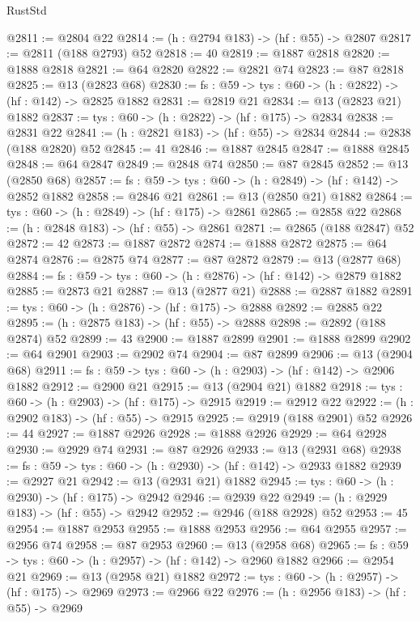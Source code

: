 \begin{lexlean}{RustStd}
\begin{coremodule}
@2811 := @2804 @22
@2814 := (h : @2794 @183) -> (hf : @55) -> @2807
@2817 := @2811 (@188 @2793) @52
@2818 := 40
@2819 := @1887 @2818
@2820 := @1888 @2818
@2821 := @64 @2820
@2822 := @2821 @74
@2823 := @87 @2818
@2825 := @13 (@2823 @68)
@2830 := {fs : @59} -> {tys : @60} -> (h : @2822) -> (hf : @142) -> @2825 @1882
@2831 := @2819 @21
@2834 := @13 (@2823 @21) @1882
@2837 := {tys : @60} -> (h : @2822) -> (hf : @175) -> @2834
@2838 := @2831 @22
@2841 := (h : @2821 @183) -> (hf : @55) -> @2834
@2844 := @2838 (@188 @2820) @52
@2845 := 41
@2846 := @1887 @2845
@2847 := @1888 @2845
@2848 := @64 @2847
@2849 := @2848 @74
@2850 := @87 @2845
@2852 := @13 (@2850 @68)
@2857 := {fs : @59} -> {tys : @60} -> (h : @2849) -> (hf : @142) -> @2852 @1882
@2858 := @2846 @21
@2861 := @13 (@2850 @21) @1882
@2864 := {tys : @60} -> (h : @2849) -> (hf : @175) -> @2861
@2865 := @2858 @22
@2868 := (h : @2848 @183) -> (hf : @55) -> @2861
@2871 := @2865 (@188 @2847) @52
@2872 := 42
@2873 := @1887 @2872
@2874 := @1888 @2872
@2875 := @64 @2874
@2876 := @2875 @74
@2877 := @87 @2872
@2879 := @13 (@2877 @68)
@2884 := {fs : @59} -> {tys : @60} -> (h : @2876) -> (hf : @142) -> @2879 @1882
@2885 := @2873 @21
@2887 := @13 (@2877 @21)
@2888 := @2887 @1882
@2891 := {tys : @60} -> (h : @2876) -> (hf : @175) -> @2888
@2892 := @2885 @22
@2895 := (h : @2875 @183) -> (hf : @55) -> @2888
@2898 := @2892 (@188 @2874) @52
@2899 := 43
@2900 := @1887 @2899
@2901 := @1888 @2899
@2902 := @64 @2901
@2903 := @2902 @74
@2904 := @87 @2899
@2906 := @13 (@2904 @68)
@2911 := {fs : @59} -> {tys : @60} -> (h : @2903) -> (hf : @142) -> @2906 @1882
@2912 := @2900 @21
@2915 := @13 (@2904 @21) @1882
@2918 := {tys : @60} -> (h : @2903) -> (hf : @175) -> @2915
@2919 := @2912 @22
@2922 := (h : @2902 @183) -> (hf : @55) -> @2915
@2925 := @2919 (@188 @2901) @52
@2926 := 44
@2927 := @1887 @2926
@2928 := @1888 @2926
@2929 := @64 @2928
@2930 := @2929 @74
@2931 := @87 @2926
@2933 := @13 (@2931 @68)
@2938 := {fs : @59} -> {tys : @60} -> (h : @2930) -> (hf : @142) -> @2933 @1882
@2939 := @2927 @21
@2942 := @13 (@2931 @21) @1882
@2945 := {tys : @60} -> (h : @2930) -> (hf : @175) -> @2942
@2946 := @2939 @22
@2949 := (h : @2929 @183) -> (hf : @55) -> @2942
@2952 := @2946 (@188 @2928) @52
@2953 := 45
@2954 := @1887 @2953
@2955 := @1888 @2953
@2956 := @64 @2955
@2957 := @2956 @74
@2958 := @87 @2953
@2960 := @13 (@2958 @68)
@2965 := {fs : @59} -> {tys : @60} -> (h : @2957) -> (hf : @142) -> @2960 @1882
@2966 := @2954 @21
@2969 := @13 (@2958 @21) @1882
@2972 := {tys : @60} -> (h : @2957) -> (hf : @175) -> @2969
@2973 := @2966 @22
@2976 := (h : @2956 @183) -> (hf : @55) -> @2969

\end{coremodule}
\end{lexlean}
